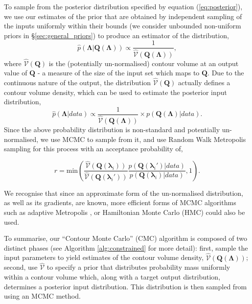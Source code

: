 \documentclass[10pt,letterpaper]{article}
\begin{document}
%
To sample from the posterior distribution specified by equation (\ref{eq:posterior}), we use our estimates of the prior that are obtained by independent sampling of the inputs uniformly within their bounds (we consider unbounded non-uniform priors in \S \ref{sec:general_priors}) to produce an estimator of the distribution,
%
\begin{equation}
\hat{p}(\boldsymbol{\Lambda}|\boldsymbol{Q}(\boldsymbol{\Lambda})) \propto \frac{1}{\widehat{\mathcal{V}}(\boldsymbol{Q}(\boldsymbol{\Lambda}))},
\end{equation}
%
where $\widehat{\mathcal{V}}(\boldsymbol{Q})$ is the (potentially un-normalised) contour volume at an output value of $\boldsymbol{Q}$ - a measure of the size of the input set which maps to $\boldsymbol{Q}$. Due to the continuous nature of the output, the distribution $\widehat{\mathcal{V}}(\boldsymbol{Q})$ actually defines a contour volume density, which can be used to estimate the posterior input distribution,
%
\begin{equation}\label{eq:posterior_approx}
\hat{p}(\boldsymbol{\Lambda}|data) \propto \frac{1}{\widehat{\mathcal{V}}(\boldsymbol{Q}(\boldsymbol{\Lambda}))} \times p(\boldsymbol{Q}(\boldsymbol{\Lambda})|data).
\end{equation}
%
Since the above probability distribution is non-standard and potentially un-normalised, we use MCMC to sample from it, and use Random Walk Metropolis sampling \cite{lambert2018Student} for this process with an acceptance probability of,

\begin{equation}\label{eq:RMW_selection}
r = \text{min}\left( \frac{\widehat{\mathcal{V}}(\boldsymbol{Q}(\boldsymbol{\lambda}_i))}{\widehat{\mathcal{V}}(\boldsymbol{Q}(\boldsymbol{\lambda}_i'))} \frac{p(\boldsymbol{Q}(\boldsymbol{\lambda}_i')|data)}{p(\boldsymbol{Q}(\boldsymbol{\lambda}_i)|data)} ,1 \right).
\end{equation}


We recognise that since an approximate form of the un-normalised distribution, as well as its gradients, are known, more efficient forms of MCMC algorithms such as adaptive Metropolis \cite{haario2001adaptive}, or Hamiltonian Monte Carlo (HMC) \cite{neal2011mcmc} could also be used.

To summarise, our ``Contour Monte Carlo'' (CMC) algorithm is composed of two distinct phases (see Algorithm \ref{alg:constrained} for more detail): first, sample the input parameters to yield estimates of the contour volume density, $\widehat{\mathcal{V}}(\boldsymbol{Q}(\boldsymbol{\Lambda}))$; second, use $\widehat{\mathcal{V}}$ to specify a prior that distributes probability mass uniformly within a contour volume which, along with a target output distribution, determines a posterior input distribution. This distribution is then sampled from using an MCMC method.
\end{document}
